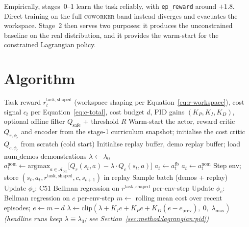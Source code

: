 \documentclass[11pt,a4paper]{report}
\newcommand{\coworker}{\textsc{coworker}}
\begin{document}
Empirically, stages~0--1 learn the task reliably, with
\texttt{ep\_reward} around $+1.8$. Direct training on the full
\coworker{} band instead diverges and evacuates the workspace. Stage~2
then serves two purposes: it produces the unconstrained baseline on the
real distribution, and it provides the warm-start for the constrained
Lagrangian policy.


\section{Algorithm}
\label{sec:method:algorithm}

\begin{algorithm}[H]
\caption{The value-based Lagrangian training loop (headline
dual-critic, mean-cost formulation). Because the backbone is
critic-only, the constraint enters through action selection on
$Q_r - \lambda Q_c$ rather than through an actor update: both
critics train on stationary Bellman targets, the cost critic is
backed up at per-env-step granularity, and $\lambda$ is fixed in the
headline configuration because PID auto-tuning is seed-unstable at
the feasibility boundary (Section~\ref{sec:results:budget}).}
\label{alg:constrained-rl}
\begin{algorithmic}[1]
\Require Task reward $r^{\mathrm{task,shaped}}_t$ (workspace shaping
  per Equation~\ref{eq:r-workspace}), cost signal $c_t$ per
  Equation~\ref{eq:c-total}, cost budget $d$, PID gains
  $(K_P, K_I, K_D)$, optional offline filter $Q_{\mathrm{safe}}$ +
  threshold $R$
\State Warm-start the actor, reward critic $Q_{r,\phi_r}$ and
  encoder from the stage-1 curriculum snapshot; initialise the cost
  critic $Q_{c,\phi_c}$ from scratch (cold start)
\State Initialise replay buffer, demo replay buffer; load
  $\text{num\_demos}$ demonstrations
\State $\lambda \leftarrow \lambda_0$ 
  \State $a^{\mathrm{nom}}_t \leftarrow \mathrm{argmax}_{a \in
  \mathcal{A}_{\mathrm{bin}}}\!\big[Q_r(s_t,a) - \lambda \cdot
  Q_c(s_t,a)\big]$
    \State $a_t \leftarrow a^{\mathrm{fb}}_t$ 
  \Else
    \State $a_t \leftarrow a^{\mathrm{nom}}_t$
  \EndIf
  \State Step env; store $(s_t, a_t, r^{\mathrm{task,shaped}}, c,
    s_{t+1})$ in replay
  \State Sample batch (demos + replay)
  \State Update $\phi_r$: C51 Bellman regression on
    $r^{\mathrm{task,shaped}}$ per-env-step
  \State Update $\phi_c$: Bellman regression on $c$ per-env-step
    \State $m \leftarrow$ rolling mean cost over recent episodes;
      \quad $e \leftarrow m - d$
    \State $\lambda \leftarrow \mathrm{clip}(\lambda + K_I e
      + K_P e + K_D (e - e_{\mathrm{prev}}),\; 0,\; \lambda_{\max})$
  \EndIf
  \Statex \hspace{\algorithmicindent}\textit{(headline runs keep
    $\lambda \equiv \lambda_0$; see
    Section~\ref{sec:method:lagrangian:pid})}
\EndFor
\end{algorithmic}
\end{algorithm}
\end{document}
